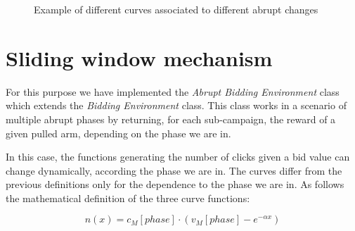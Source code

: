 \begin{figure}[!htb]
	\caption{Example of different curves associated to different abrupt changes}
	\label{abruptFigure}
\end{figure}


\section{Sliding window mechanism}
For this purpose we have implemented the \textit{Abrupt Bidding Environment} class which extends the \textit{Bidding Environment} class. This class works in a scenario of multiple abrupt phases by returning, for each sub-campaign, the reward of a given pulled arm, depending on the phase we are in.

In this case, the functions generating  the number of clicks given a bid value can change dynamically, according the phase we are in.
The curves differ from the previous definitions only for the dependence to the phase we are in. As follows the mathematical definition of the three curve functions:

\begin{equation}
	n(x) = c_{M}[phase] \cdot (v_{M}[phase] - e^{-\alpha x})
\end{equation}

